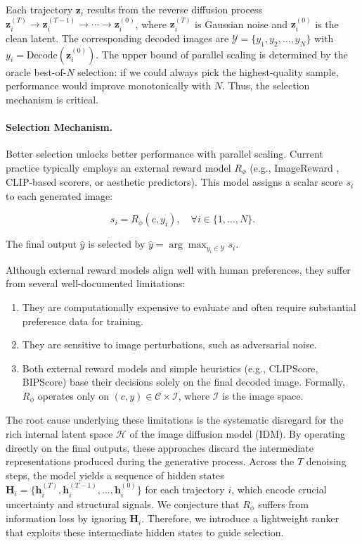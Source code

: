 \documentclass{article}
\begin{document}
Each trajectory $\mathbf{z}_i$ results from the reverse diffusion process $\mathbf{z}_i^{(T)} \to \mathbf{z}_i^{(T-1)} \to \cdots \to \mathbf{z}_i^{(0)}$, where $\mathbf{z}_i^{(T)}$ is Gaussian noise and $\mathbf{z}_i^{(0)}$ is the clean latent. The corresponding decoded images are $\mathcal{Y} = \{y_1, y_2, \ldots, y_N\}$ with $y_i = \text{Decode}(\mathbf{z}_i^{(0)})$. The upper bound of parallel scaling is determined by the oracle best-of-$N$ selection: if we could always pick the highest-quality sample, performance would improve monotonically with $N$. Thus, the selection mechanism is critical.

\paragraph{Selection Mechanism.}

Better selection unlocks better performance with parallel scaling. Current practice typically employs an external reward model $R_{\phi}$ (e.g., ImageReward \citep{xu2023imagereward}, CLIP-based scorers, or aesthetic predictors). This model assigns a scalar score $s_i$ to each generated image:

\begin{equation}
    s_i = R_{\phi}(c, y_i), \quad \forall i \in \{1, \ldots, N\}.
\end{equation}

The final output $\hat{y}$ is selected by $\hat{y} = \arg\max_{y_i \in \mathcal{Y}} s_i$.

Although external reward models align well with human preferences, they suffer from several well-documented limitations:
\begin{enumerate}
    \item They are computationally expensive to evaluate and often require substantial preference data for training.
    \item They are sensitive to image perturbations, such as adversarial noise.
    \item Both external reward models and simple heuristics (e.g., CLIPScore, BIPScore) base their decisions solely on the final decoded image. Formally, $R_{\phi}$ operates only on $(c, y) \in \mathcal{C} \times \mathcal{I}$, where $\mathcal{I}$ is the image space.
\end{enumerate}
The root cause underlying these limitations is the systematic disregard for the rich internal latent space $\mathcal{H}$ of the image diffusion model (IDM). By operating directly on the final outputs, these approaches discard the intermediate representations produced during the generative process. Across the $T$ denoising steps, the model yields a sequence of hidden states $\mathbf{H}_i = \{\mathbf{h}_i^{(T)}, \mathbf{h}_i^{(T-1)}, \ldots, \mathbf{h}_i^{(0)}\}$ for each trajectory $i$, which encode crucial uncertainty and structural signals. We conjecture that $R_{\phi}$ suffers from information loss by ignoring $\mathbf{H}_i$. Therefore, we introduce a lightweight ranker that exploits these intermediate hidden states to guide selection.
\end{document}
